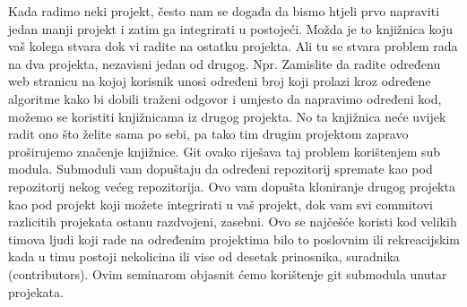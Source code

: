 \documentclass {article}
\begin{document}
Kada radimo neki projekt, često nam se događa da bismo htjeli prvo napraviti jedan manji projekt i zatim ga integrirati u postojeći. Možda je to knjižnica koju vaš kolega stvara dok vi radite na ostatku projekta. Ali tu se stvara problem rada na dva projekta, nezavisni jedan od drugog.
\newline
Npr. Zamislite da radite određenu web stranicu na kojoj korisnik unosi određeni broj koji prolazi kroz određene algoritme kako bi dobili traženi odgovor i umjesto da napravimo određeni kod, možemo se koristiti knjižnicama iz drugog projekta. No ta knjižnica neće uvijek radit ono što želite sama po sebi, pa tako tim drugim projektom zapravo proširujemo značenje knjižnice.
\newline
Git ovako riješava  taj problem korištenjem sub modula. Submoduli vam dopuštaju da određeni repozitorij spremate kao pod repozitorij nekog većeg repozitorija.
\newline
Ovo vam dopušta kloniranje drugog projekta kao pod projekt koji možete integrirati u vaš projekt, dok vam svi commitovi razlicitih projekata ostanu razdvojeni, zasebni.
\newline
Ovo se najčešće koristi kod velikih timova ljudi koji rade na određenim projektima bilo to poslovnim ili rekreacijskim kada u timu postoji nekolicina ili vise od desetak prinosnika, suradnika (contributors).
\newline
Ovim seminarom objasnit ćemo korištenje git submodula unutar projekata.

\newpage
\end{document}
